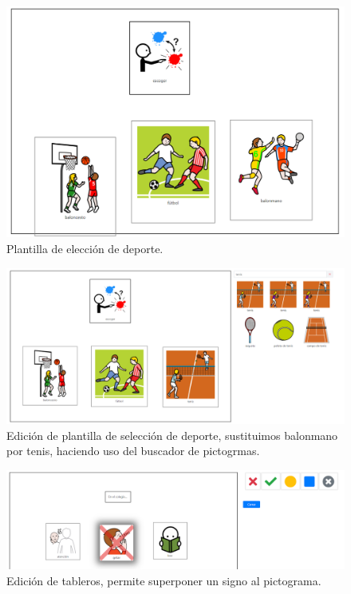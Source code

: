 	\begin{figure}[h!]
		\centering
		\includegraphics[width=0.7\linewidth]{Imagenes/Bitmap/pictableros1}
		\caption{Plantilla de elección de deporte.}
		\label{fig:pictableros1}
	\end{figure}
	
	
	\begin{figure}[h!]
		\centering
		\includegraphics[width=0.7\linewidth]{Imagenes/Bitmap/pictableros2}
		\caption{Edición de plantilla de selección de deporte, sustituimos balonmano por tenis, haciendo uso del buscador de pictogrmas.}
		\label{fig:pictableros2}
	\end{figure}
	
	\begin{figure}[h!]
		\centering
		\includegraphics[width=0.7\linewidth]{Imagenes/Bitmap/pictableros3}
		\caption{Edición de tableros, permite superponer un signo al pictograma.}
		\label{fig:pictableros3}
	\end{figure}
	

\newpage
	
